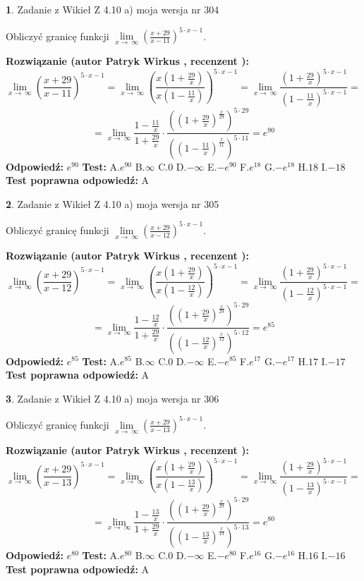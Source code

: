 \documentclass[12pt, a4paper]{article}
\theoremstyle{definition} %
\newtheorem{zad}{}
\newcommand{\zadStart}[1]{\begin{zad}#1\newline}
\newcommand{\zadStop}{\end{zad}}
\newcommand{\rozwStart}[2]{\noindent \textbf{Rozwiązanie (autor #1 , recenzent #2): }\newline}
\newcommand{\rozwStop}{\newline}
\newcommand{\odpStart}{\noindent \textbf{Odpowiedź:}\newline}
\newcommand{\odpStop}{\newline}
\newcommand{\testStart}{\noindent \textbf{Test:}\newline}
\newcommand{\testStop}{\newline}
\newcommand{\kluczStart}{\noindent \textbf{Test poprawna odpowiedź:}\newline}
\newcommand{\kluczStop}{\newline}
\begin{document}
\zadStart{Zadanie z Wikieł Z 4.10 a) moja wersja nr 304}

Obliczyć granicę funkcji  $\lim\limits_{x\to\ \infty}(\frac{x+29}{x-11})^{5\cdot x-1}$.
\zadStop
\rozwStart{Patryk Wirkus}{}
$$\lim\limits_{x\to\ \infty}(\frac{x+29}{x-11})^{5\cdot x-1} = \lim\limits_{x\to\ \infty}(\frac{x(1+\frac{29}{x})}{x(1-\frac{11}{x})})^{5\cdot x-1}=\lim\limits_{x\to\ \infty}\frac{(1+\frac{29}{x})^{5\cdot x-1}}{(1-\frac{11}{x})^{5\cdot x-1}}=$$
$$=\lim\limits_{x\to\ \infty}\frac{1-\frac{11}{x}}{1+\frac{29}{x}}\cdot\frac{((1+\frac{29}{x})^{\frac{x}{29}})^{5\cdot29}}{((1-\frac{11}{x})^{\frac{x}{11}})^{5\cdot11}}=e^{90}$$
\rozwStop
\odpStart
$e^{90}$
\odpStop
\testStart
A.$e^{90}$ B.$\infty$ C.$0$ D.$-\infty$ E.$-e^{90}$
F.$e^{18}$ G.$-e^{18}$
H.$18$
I.$-18$
\testStop
\kluczStart
A
\kluczStop



\zadStart{Zadanie z Wikieł Z 4.10 a) moja wersja nr 305}

Obliczyć granicę funkcji  $\lim\limits_{x\to\ \infty}(\frac{x+29}{x-12})^{5\cdot x-1}$.
\zadStop
\rozwStart{Patryk Wirkus}{}
$$\lim\limits_{x\to\ \infty}(\frac{x+29}{x-12})^{5\cdot x-1} = \lim\limits_{x\to\ \infty}(\frac{x(1+\frac{29}{x})}{x(1-\frac{12}{x})})^{5\cdot x-1}=\lim\limits_{x\to\ \infty}\frac{(1+\frac{29}{x})^{5\cdot x-1}}{(1-\frac{12}{x})^{5\cdot x-1}}=$$
$$=\lim\limits_{x\to\ \infty}\frac{1-\frac{12}{x}}{1+\frac{29}{x}}\cdot\frac{((1+\frac{29}{x})^{\frac{x}{29}})^{5\cdot29}}{((1-\frac{12}{x})^{\frac{x}{12}})^{5\cdot12}}=e^{85}$$
\rozwStop
\odpStart
$e^{85}$
\odpStop
\testStart
A.$e^{85}$ B.$\infty$ C.$0$ D.$-\infty$ E.$-e^{85}$
F.$e^{17}$ G.$-e^{17}$
H.$17$
I.$-17$
\testStop
\kluczStart
A
\kluczStop



\zadStart{Zadanie z Wikieł Z 4.10 a) moja wersja nr 306}

Obliczyć granicę funkcji  $\lim\limits_{x\to\ \infty}(\frac{x+29}{x-13})^{5\cdot x-1}$.
\zadStop
\rozwStart{Patryk Wirkus}{}
$$\lim\limits_{x\to\ \infty}(\frac{x+29}{x-13})^{5\cdot x-1} = \lim\limits_{x\to\ \infty}(\frac{x(1+\frac{29}{x})}{x(1-\frac{13}{x})})^{5\cdot x-1}=\lim\limits_{x\to\ \infty}\frac{(1+\frac{29}{x})^{5\cdot x-1}}{(1-\frac{13}{x})^{5\cdot x-1}}=$$
$$=\lim\limits_{x\to\ \infty}\frac{1-\frac{13}{x}}{1+\frac{29}{x}}\cdot\frac{((1+\frac{29}{x})^{\frac{x}{29}})^{5\cdot29}}{((1-\frac{13}{x})^{\frac{x}{13}})^{5\cdot13}}=e^{80}$$
\rozwStop
\odpStart
$e^{80}$
\odpStop
\testStart
A.$e^{80}$ B.$\infty$ C.$0$ D.$-\infty$ E.$-e^{80}$
F.$e^{16}$ G.$-e^{16}$
H.$16$
I.$-16$
\testStop
\kluczStart
A
\kluczStop
\end{document}
